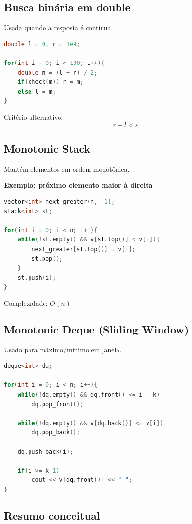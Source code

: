 \documentclass[11pt]{article}
\begin{document}
\subsection{Busca binária em double}

Usada quando a resposta é contínua.

\begin{lstlisting}[language=C++]
double l = 0, r = 1e9;

for(int i = 0; i < 100; i++){
    double m = (l + r) / 2;
    if(check(m)) r = m;
    else l = m;
}
\end{lstlisting}

Critério alternativo:
\[
r - l < \varepsilon
\]

\subsection{Monotonic Stack}

Mantém elementos em ordem monotônica.

\textbf{Exemplo: próximo elemento maior à direita}

\begin{lstlisting}[language=C++]
vector<int> next_greater(n, -1);
stack<int> st;

for(int i = 0; i < n; i++){
    while(!st.empty() && v[st.top()] < v[i]){
        next_greater[st.top()] = v[i];
        st.pop();
    }
    st.push(i);
}
\end{lstlisting}

Complexidade: \(O(n)\)

\subsection{Monotonic Deque (Sliding Window)}

Usado para máximo/mínimo em janela.

\begin{lstlisting}[language=C++]
deque<int> dq;

for(int i = 0; i < n; i++){
    while(!dq.empty() && dq.front() <= i - k)
        dq.pop_front();

    while(!dq.empty() && v[dq.back()] <= v[i])
        dq.pop_back();

    dq.push_back(i);

    if(i >= k-1)
        cout << v[dq.front()] << " ";
}
\end{lstlisting}

\subsection{Resumo conceitual}
\end{document}
